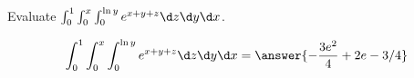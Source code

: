 \documentclass{ximera}
\author{David Guichard \and Neal Koblitz \and H. Jerome Keisler \and Albert Scheller \and Barry Balof \and Mike Wills \and Matthew Carr}
\begin{document}
\begin{exercise}





Evaluate  $\int_{0}^{1}\int_{0}^{x}\int_{0}^{\ln y}e^{x+y+z}\d z\d y\d x$.

\begin{prompt}
\[
\int_{0}^{1}\int_{0}^{x}\int_{0}^{\ln y}e^{x+y+z}\d z\d y\d x=\answer{-\frac{3e^2}{4}+2e-3/4}
\]
\end{prompt}



\end{exercise}
\end{document}

